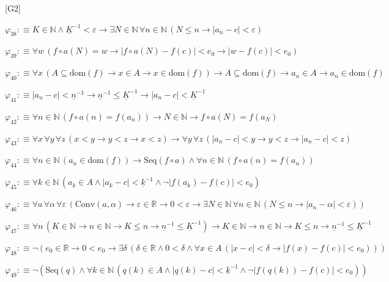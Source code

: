 \begin{fullproof}{[G2]}
\begin{abbrevlist}
\item $\varphi_{38} :\equiv K \in \mathbb{N} \land \underline{K}^{-1} < \varepsilon \to \exists N \in \mathbb{N}\,\forall n \in \mathbb{N}\,(N \leq n \to \lvert a_{n} - c \rvert < \varepsilon)$
\item $\varphi_{39} :\equiv \forall w\,(f \circ a(N) = w \to \lvert f \circ a(N) - f(c) \rvert < e_{0} \to \lvert w - f(c) \rvert < e_{0})$
\item $\varphi_{40} :\equiv \forall x\,(A \subseteq \mathrm{dom}(f) \to x \in A \to x \in \mathrm{dom}(f)) \to A \subseteq \mathrm{dom}(f) \to a_{n} \in A \to a_{n} \in \mathrm{dom}(f)$
\item $\varphi_{41} :\equiv \lvert a_{n} - c \rvert < \underline{n}^{-1} \to \underline{n}^{-1} \leq \underline{K}^{-1} \to \lvert a_{n} - c \rvert < \underline{K}^{-1}$
\item $\varphi_{42} :\equiv \forall n \in \mathbb{N}\,(f \circ a(n) = f(a_{n})) \to N \in \mathbb{N} \to f \circ a(N) = f(a_{N})$
\item $\varphi_{43} :\equiv \forall x\,\forall y\,\forall z\,(x < y \to y < z \to x < z) \to \forall y\,\forall z\,(\lvert a_{n} - c \rvert < y \to y < z \to \lvert a_{n} - c \rvert < z)$
\item $\varphi_{44} :\equiv \forall n \in \mathbb{N}\,(a_{n} \in \mathrm{dom}(f)) \to \mathrm{Seq}(f \circ a) \land \forall n \in \mathbb{N}\,(f \circ a(n) = f(a_{n}))$
\item $\varphi_{45} :\equiv \forall k \in \mathbb{N}\,(a_{k} \in A \land \lvert a_{k} - c \rvert < \underline{k}^{-1} \land \neg \lvert f(a_{k}) - f(c) \rvert < e_{0})$
\item $\varphi_{46} :\equiv \forall a\,\forall \alpha\,\forall \varepsilon\,(\mathrm{Conv}(a,\alpha) \to \varepsilon \in \mathbb{R} \to 0 < \varepsilon \to \exists N \in \mathbb{N}\,\forall n \in \mathbb{N}\,(N \leq n \to \lvert a_{n} - \alpha \rvert < \varepsilon))$
\item $\varphi_{47} :\equiv \forall n\,(K \in \mathbb{N} \to n \in \mathbb{N} \to K \leq n \to \underline{n}^{-1} \leq \underline{K}^{-1}) \to K \in \mathbb{N} \to n \in \mathbb{N} \to K \leq n \to \underline{n}^{-1} \leq \underline{K}^{-1}$
\item $\varphi_{48} :\equiv \neg (e_{0} \in \mathbb{R} \to 0 < e_{0} \to \exists \delta\,(\delta \in \mathbb{R} \land 0 < \delta \land \forall x \in A\,(\lvert x - c \rvert < \delta \to \lvert f(x) - f(c) \rvert < e_{0})))$
\item $\varphi_{49} :\equiv \neg (\mathrm{Seq}(q) \land \forall k \in \mathbb{N}\,(q(k) \in A \land \lvert q(k) - c \rvert < \underline{k}^{-1} \land \neg \lvert f(q(k)) - f(c) \rvert < e_{0}))$

\end{abbrevlist}
\end{fullproof}
